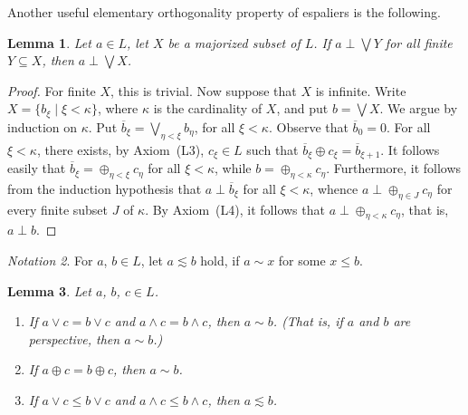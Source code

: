 \documentclass[psamsfonts,reqno]{memo-l}
\theoremstyle{plain}
\newtheorem{lemma}{Lemma}[section]
\theoremstyle{definition}
\theoremstyle{remark}
\newtheorem{notation}[lemma]{Notation}
\numberwithin{equation}{section}
\newcommand{\oll}[1]{\overline{#1}}
\newcommand{\set}[1]{\{#1\}}
\newcommand{\setm}[2]{\set{#1\mid#2}}
\begin{document}
Another useful elementary orthogonality property of
espaliers is the following.

\begin{lemma}\label{L:aperpJJX}
Let $a\in L$, let $X$ be a majorized subset of $L$.
If $a\perp\bigvee Y$ for all finite $Y\subseteq X$, then $a\perp\bigvee X$.
\end{lemma}

\begin{proof}
For finite $X$, this is trivial. Now suppose that $X$ is infinite. Write
$X=\setm{b_\xi}{\xi<\kappa}$, where $\kappa$ is the cardinality of $X$, and
put $b=\bigvee X$. We argue by induction on $\kappa$. Put
$\oll{b}_\xi=\bigvee_{\eta<\xi}b_\eta$, for all $\xi<\kappa$.
Observe that $\oll{b}_0=0$. For all
$\xi<\kappa$, there exists, by Axiom~(L3), $c_\xi\in L$ such that
$\oll{b}_\xi\oplus c_\xi=\oll{b}_{\xi+1}$. It follows easily that
$\oll{b}_\xi=\oplus_{\eta<\xi}c_\eta$ for all $\xi<\kappa$, while
$b=\oplus_{\eta<\kappa}c_\eta$. Furthermore, it follows from the induction
hypothesis that $a\perp\oll{b}_\xi$ for all $\xi<\kappa$, whence
$a\perp\oplus_{\eta\in J}c_\eta$ for every finite subset $J$ of $\kappa$. By
Axiom~(L4), it follows that $a\perp\oplus_{\eta<\kappa}c_\eta$, that is,
$a\perp b$.
\end{proof}

\begin{notation}
For $a$, $b\in L$, let $a\lesssim b$ hold,
if $a\sim x$ for some $x\leq b$.
\end{notation}

\begin{lemma}\label{L:DotJoinSim}
Let $a$, $b$, $c\in L$.
\begin{enumerate}
\item If $a\vee c=b\vee c$ and $a\wedge c=b\wedge c$, then $a\sim b$.
\emph{(That is, if $a$ and $b$ are perspective, then $a\sim b$.)}

\item If $a\oplus c=b\oplus c$, then $a\sim b$.

\item If $a\vee c\leq b\vee c$ and $a\wedge c\leq b\wedge c$, then
$a\lesssim b$.
\end{enumerate}

\end{lemma}
\end{document}
